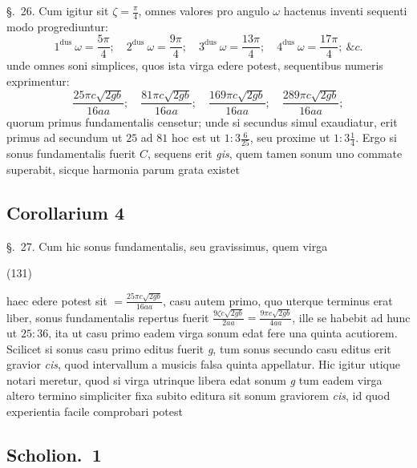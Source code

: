 \documentclass[11pt,a4paper]{article}
\begin{document}
§.~26. Cum igitur sit $\zeta = \frac{\pi}{4}$, omnes valores pro angulo
\emph{$\omega$} hactenus inventi sequenti modo progrediuntur:
\[
1^{\text{dus}}\ \omega = \frac{5\pi}{4};\quad 2^{\text{dus}}\ \omega = \frac{9\pi}{4};\quad
3^{\text{dus}}\ \omega = \frac{13\pi}{4};\quad 4^{\text{dus}}\ \omega = \frac{17\pi}{4};\ \&c.
\]
unde omnes soni simplices, quos ista virga edere potest, sequentibus numeris
exprimentur:
\[
\frac{25\pi c\sqrt{2gb}}{16aa};\quad \frac{81\pi c\sqrt{2gb}}{16aa};\quad
\frac{169\pi c\sqrt{2gb}}{16aa};\quad \frac{289\pi c\sqrt{2gb}}{16aa};
\]
quorum primus fundamentalis censetur; unde si secundus simul exaudiatur, erit primus
ad secundum ut $25$ ad $81$ hoc est ut $1 : 3\frac{6}{25}$, seu proxime ut
$1 : 3\frac{1}{4}$. Ergo si sonus fundamentalis fuerit $C$, sequens erit \emph{gis},
quem tamen sonum uno commate superabit, sicque harmonia parum grata existet

\subsection{Corollarium 4}

§.~27. Cum hic sonus fundamentalis, seu gravissimus, quem virga

(131)

haec edere potest sit $= \frac{25\pi c\sqrt{2gb}}{16aa}$, casu autem primo, quo
uterque terminus erat liber, sonus fundamentalis repertus fuerit
$\frac{9\zeta c\sqrt{2gb}}{2aa} = \frac{9\pi c\sqrt{2gb}}{4aa}$, ille se habebit ad
hunc ut $25 : 36$, ita ut casu primo eadem virga sonum edat fere una quinta
acutiorem. Scilicet si sonus casu primo editus fuerit \emph{g}, tum sonus secundo
casu editus erit gravior \emph{cis}, quod intervallum a musicis falsa quinta
appellatur. Hic igitur utique notari meretur, quod si virga utrinque libera edat
sonum \emph{g} tum eadem virga altero termino simpliciter fixa subito editura sit
sonum graviorem \emph{cis}, id quod experientia facile comprobari potest

\subsection{Scholion.~1}
\end{document}
